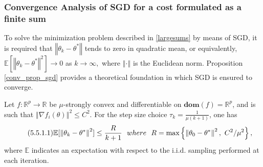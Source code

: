 \subsubsection{Convergence Analysis of SGD for a cost formulated as a finite sum} 
To solve the minimization problem described in \eqref{largesums} by means of SGD, it is required that $\left\Vert \theta_{k} - \theta^{*}\right\Vert$ tends to zero in quadratic mean, or equivalently, $\mathbb{E}[\left\Vert \theta_{k} - \theta^{*}\right\Vert^{2}] \rightarrow 0$ as $k \rightarrow \infty,$ where $\left\Vert\cdot\right\Vert$ is the Euclidean norm. Proposition \ref{conv_prop_sgd} provides a theoretical foundation in which SGD is ensured to converge. 
\begin{proposition}\label{conv_prop_sgd}
Let $f: \mathbb{R}^{p} \longrightarrow \mathbb{R}$ be $\mu$-strongly convex and differentiable on $\textbf{dom}(f) = \mathbb{R}^{p}$, and is such that $\left\Vert\nabla f_{i}(\theta)\right\Vert^{2} \leq C^{2}.$ For the step size choice $\tau_{k} = \frac{1}{\mu (k+1)}$, one has
\begin{equation*}\label{bound_conv_SGD}\tag{5.5.1.1}
\mathbb{E}[\left\Vert \theta_{k} - \theta^{*}\right\Vert^{2}] \leq \frac{R}{k+1}\text{ }\text{ } where \text{ }\text{ } R = \textnormal{max}\left\{\left\Vert \theta_{0} - \theta^{*}\right\Vert^{2},\text{ } C^{2}/\mu^{2}\right\},
\end{equation*}
where $\mathbb{E}$ indicates an expectation with respect to the i.i.d. sampling performed at each iteration.
\end{proposition}
